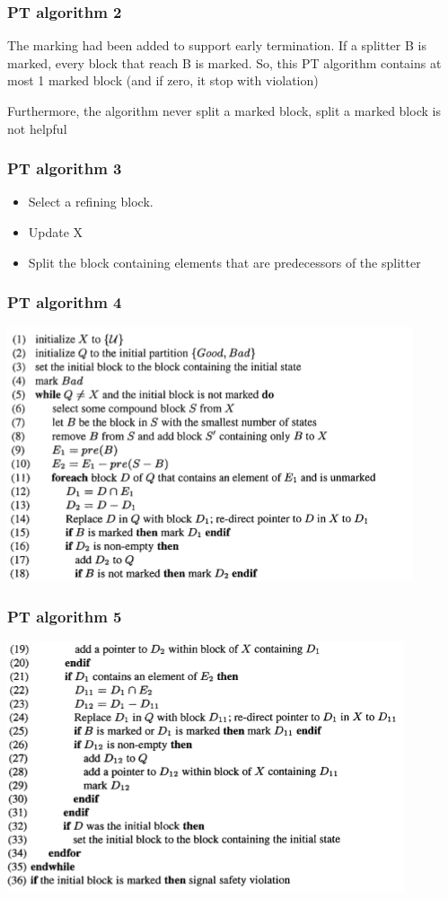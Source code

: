 \documentclass[11pt,handout]{beamer}
\begin{document}
\begin{frame}
 \frametitle{PT algorithm 2}
  The marking had been added to support early termination. If a splitter B is marked, every block that reach B is marked.
  So, this PT algorithm contains at most 1 marked block (and if zero, it stop with violation)
  
  Furthermore, the algorithm never split a marked block, split a marked block is not helpful
\end{frame}

\begin{frame}
 \frametitle{PT algorithm 3}
  \begin{itemize}
   \item Select a refining block.
   \item Update X
   \item Split the block containing elements that are predecessors of the splitter
  \end{itemize}
\end{frame}

\begin{frame}
 \frametitle{PT algorithm 4}
\includegraphics{figures/algo_part1}
\end{frame}

\begin{frame}
 \frametitle{PT algorithm 5}
\includegraphics{figures/algo_part2}
\end{frame}
\end{document}
